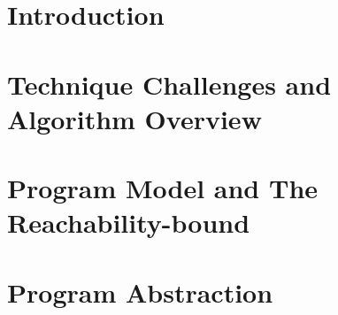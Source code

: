 \documentclass[manuscript,acmsmall,anonymous,review,screen,nonacm=true, authorversion=true]{acmart}
\begin{document}




\maketitle


\section{Introduction}
\label{sec:intro}



\section{Technique Challenges and Algorithm Overview}
\label{sec:overview}

\highlight{}
\section{Program Model and The Reachability-bound}
\label{sec:preliminary}
% 




\section{Program Abstraction}
\label{sec:progabs}

\end{document}
